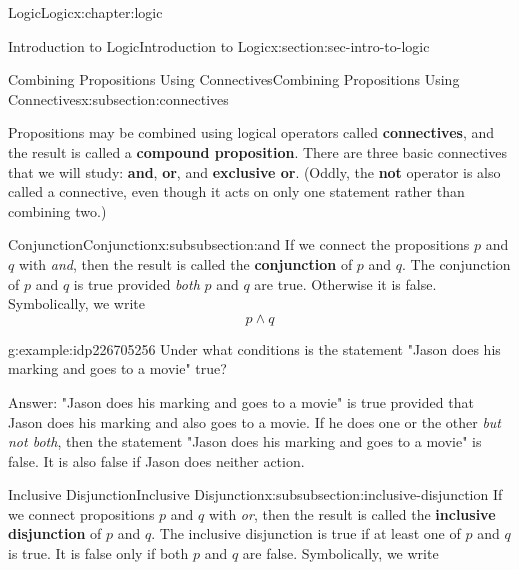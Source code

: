 \documentclass[twoside,10pt,]{book}
\newcommand{\terminology}[1]{\textbf{#1}}
\numberwithin{equation}{section}
\begin{document}
\begin{chapterptx}{Logic}{}{Logic}{}{}{x:chapter:logic}
\begin{sectionptx}{Introduction to Logic}{}{Introduction to Logic}{}{}{x:section:sec-intro-to-logic}
\typeout{************************************************}
%
\begin{subsectionptx}{Combining Propositions Using Connectives}{}{Combining Propositions Using Connectives}{}{}{x:subsection:connectives}
\begin{introduction}{}%
Propositions may be combined using logical operators called \terminology{connectives}, and the result is called a \terminology{compound proposition}.  There are three basic connectives that we will study: \terminology{and}, \terminology{or}, and \terminology{exclusive or}.  (Oddly, the \terminology{not} operator is also called a connective, even though it acts on only one statement rather than combining two.)\end{introduction}%
%
%
\typeout{************************************************}
\typeout{************************************************}
%
\begin{subsubsectionptx}{Conjunction}{}{Conjunction}{}{}{x:subsubsection:and}
If we connect the propositions \(p\) and \(q\) with \emph{and}, then the result is called the \terminology{conjunction} of \(p\) and \(q\).  The conjunction of \(p\) and \(q\) is true provided \emph{both} \(p\) and \(q\) are true.  Otherwise it is false. Symbolically, we write%
\begin{equation*}
p {\wedge} q
\end{equation*}
%
\begin{example}{}{g:example:idp226705256}%
Under what conditions is the statement "Jason does his marking and goes to a movie" true?%
\par
Answer: "Jason does his marking and goes to a movie" is true provided that Jason does his marking and also goes to a movie. If he does one or the other \emph{but not both}, then the statement "Jason does his marking and goes to a movie" is false.  It is also false if Jason does neither action.%
\end{example}
\end{subsubsectionptx}
%
%
\typeout{************************************************}
\typeout{************************************************}
%
\begin{subsubsectionptx}{Inclusive Disjunction}{}{Inclusive Disjunction}{}{}{x:subsubsection:inclusive-disjunction}
If we connect propositions \(p\) and \(q\) with \emph{or}, then the result is called the \terminology{inclusive disjunction} of \(p\) and \(q\).  The inclusive disjunction is true if at least one of \(p\) and \(q\) is true.  It is false only if both \(p\) and \(q\) are false.  Symbolically, we write%

\end{subsubsectionptx}
\end{subsectionptx}
\end{sectionptx}
\end{chapterptx}
\end{document}
